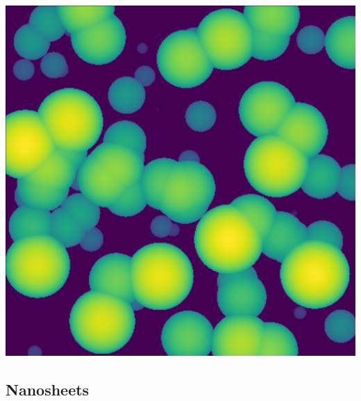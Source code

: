 \documentclass{article}
\begin{document}
\begin{center}
\begin{minipage}{0.3\textwidth}
    \end{minipage}
    \hfill
    \begin{minipage}{0.3\textwidth}
        \includegraphics*[width=\linewidth]{../images/sfera_statistica.png}
    \end{minipage}
\end{center}

\newpage

\subsection{Nanosheets}\label{subsec:Nanosheets}
\end{document}
